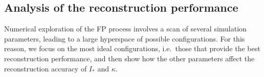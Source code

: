 
\subsection{Analysis of the reconstruction performance}


Numerical exploration of the FP process involves a scan of several simulation parameters, leading to a large hyperspace of possible configurations. For this reason, we focus on the most ideal configurations, i.e.\ those that provide the best reconstruction performance, and then show how the other parameters affect the reconstruction accuracy of $I_\ast$ and $\kappa$.

